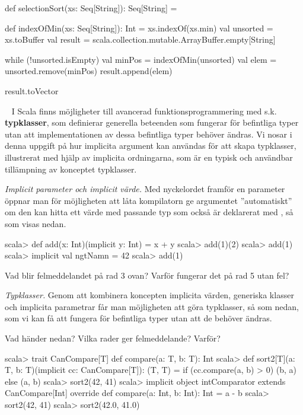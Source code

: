 \SOLUTION


\TaskSolved \what


\begin{Code}
def selectionSort(xs: Seq[String]): Seq[String] = {
  def indexOfMin(xs: Seq[String]): Int = xs.indexOf(xs.min)
  val unsorted = xs.toBuffer
  val result = scala.collection.mutable.ArrayBuffer.empty[String]

  while (!unsorted.isEmpty) {
    val minPos = indexOfMin(unsorted)
    val elem = unsorted.remove(minPos)
    result.append(elem)
  }

  result.toVector
}
\end{Code}


\QUESTEND







\QUESTBEGIN

\Task  \what~  I Scala finns möjligheter till avancerad funktionsprogrammering med s.k. \textbf{typklasser}, som definierar generella beteenden som fungerar för befintliga typer utan att implementationen av dessa befintliga typer behöver ändras. Vi nosar i denna uppgift på hur implicita argument kan användas för att skapa typklasser, illustrerat med hjälp av implicita ordningarna, som är en typisk och användbar tillämpning av konceptet typklasser.

\Subtask \emph{Implicit parameter och implicit värde.} Med nyckelordet  framför en parameter öppnar man för möjligheten att låta kompilatorn ge argumentet ''automatiskt'' om den kan hitta ett värde med passande typ som också är deklarerat med , så som visas nedan.
\begin{REPL}
scala> def add(x: Int)(implicit y: Int) = x + y
scala> add(1)(2)
scala> add(1)
scala> implicit val ngtNamn = 42
scala> add(1)
\end{REPL}
Vad blir felmeddelandet på rad 3 ovan? Varför fungerar det på rad 5 utan fel?

\Subtask \emph{Typklasser.} Genom att kombinera koncepten implicita värden, generiska klasser och implicita parametrar får man möjligheten att göra typklasser, så som  nedan, som vi kan få att fungera för befintliga typer utan att de behöver ändras.

Vad händer nedan? Vilka rader ger felmeddelande? Varför?

\begin{REPL}
scala> trait CanCompare[T] { def compare(a: T, b: T): Int }
scala> def sort2[T](a: T, b: T)(implicit cc: CanCompare[T]): (T, T) =
         if (cc.compare(a, b) > 0) (b, a) else (a, b)
scala> sort2(42, 41)
scala> implicit object intComparator extends CanCompare[Int]{
         override def compare(a: Int, b: Int): Int = a - b
       }
scala> sort2(42, 41)
scala> sort2(42.0, 41.0)
\end{REPL}


